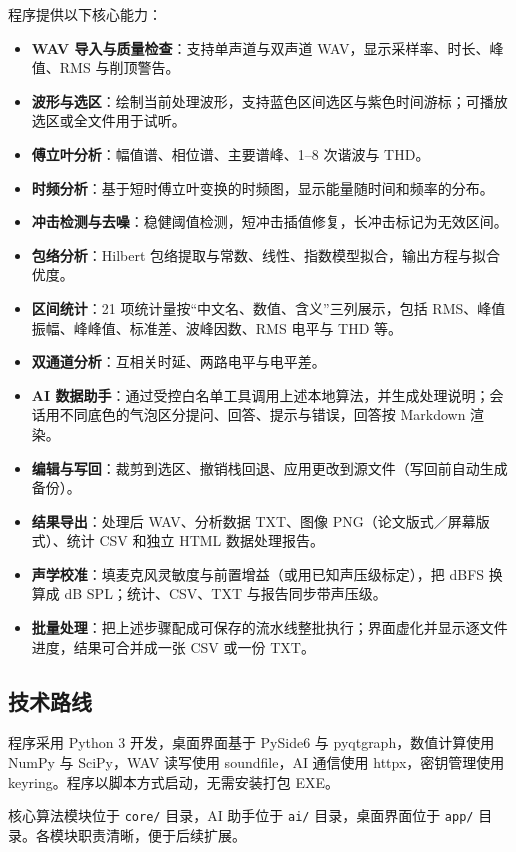 \documentclass[UTF8,a4paper,12pt,scheme=chinese]{ctexart}
\begin{document}
程序提供以下核心能力：

\begin{itemize}
  \item \textbf{WAV 导入与质量检查}：支持单声道与双声道 WAV，显示采样率、时长、峰值、RMS 与削顶警告。
  \item \textbf{波形与选区}：绘制当前处理波形，支持蓝色区间选区与紫色时间游标；可播放选区或全文件用于试听。
  \item \textbf{傅立叶分析}：幅值谱、相位谱、主要谱峰、1--8 次谐波与 THD。
  \item \textbf{时频分析}：基于短时傅立叶变换的时频图，显示能量随时间和频率的分布。
  \item \textbf{冲击检测与去噪}：稳健阈值检测，短冲击插值修复，长冲击标记为无效区间。
  \item \textbf{包络分析}：Hilbert 包络提取与常数、线性、指数模型拟合，输出方程与拟合优度。
  \item \textbf{区间统计}：21 项统计量按“中文名、数值、含义”三列展示，包括 RMS、峰值振幅、峰峰值、标准差、波峰因数、RMS 电平与 THD 等。
  \item \textbf{双通道分析}：互相关时延、两路电平与电平差。
  \item \textbf{AI 数据助手}：通过受控白名单工具调用上述本地算法，并生成处理说明；会话用不同底色的气泡区分提问、回答、提示与错误，回答按 Markdown 渲染。
  \item \textbf{编辑与写回}：裁剪到选区、撤销栈回退、应用更改到源文件（写回前自动生成备份）。
  \item \textbf{结果导出}：处理后 WAV、分析数据 TXT、图像 PNG（论文版式／屏幕版式）、统计 CSV 和独立 HTML 数据处理报告。
  \item \textbf{声学校准}：填麦克风灵敏度与前置增益（或用已知声压级标定），把 dBFS 换算成 dB SPL；统计、CSV、TXT 与报告同步带声压级。
  \item \textbf{批量处理}：把上述步骤配成可保存的流水线整批执行；界面虚化并显示逐文件进度，结果可合并成一张 CSV 或一份 TXT。
\end{itemize}

\subsection{技术路线}

程序采用 Python 3 开发，桌面界面基于 PySide6 与 pyqtgraph，数值计算使用 NumPy 与 SciPy，WAV 读写使用 soundfile，AI 通信使用 httpx，密钥管理使用 keyring。程序以脚本方式启动，无需安装打包 EXE。

核心算法模块位于 \texttt{core/} 目录，AI 助手位于 \texttt{ai/} 目录，桌面界面位于 \texttt{app/} 目录。各模块职责清晰，便于后续扩展。
\end{document}
